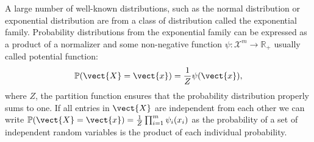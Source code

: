A large number of well-known distributions, such as the normal distribution or exponential distribution are from a class of distribution called the exponential family.
Probability distributions from the exponential family can be expressed as a product of a normalizer and some non-negative function $\psi: \mathcal{X}^m \rightarrow \mathbb{R}_+$ usually called potential function:
\begin{equation}
    \label{eq:probpot}
    \mathbb{P}(\vect{X} = \vect{x}) = \frac{1}{Z} \psi(\vect{x}),
\end{equation}
where $Z$, the partition function ensures that the probability distribution properly sums to one.
If all entries in $\vect{X}$ are independent from each other we can write $\mathbb{P}(\vect{X} = \vect{x}) = \frac{1}{Z} \prod_{i=1}^m \psi_i(x_i)$ as the probability of a set of independent random variables is the product of each individual probability.


